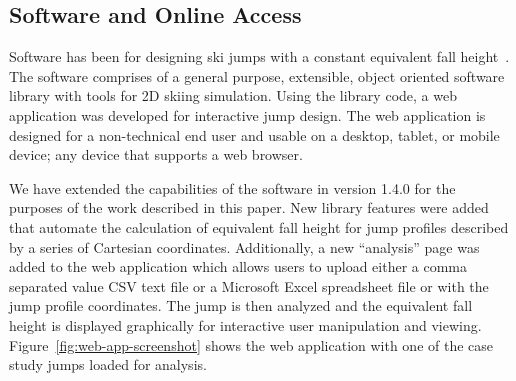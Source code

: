 \documentclass{article}
\begin{document}
\subsection{Software and Online Access}
%
Software has been for designing ski jumps with a constant equivalent fall
height~\cite{Moore2018}. The software comprises of a general purpose,
extensible, object oriented software library with tools for 2D skiing
simulation. Using the library code, a web application was developed for
interactive jump design. The web application is designed for a non-technical
end user and usable on a desktop, tablet, or mobile device; any device that
supports a web browser.

We have extended the capabilities of the software in version 1.4.0 for the
purposes of the work described in this paper. New library features were added
that automate the calculation of equivalent fall height for jump profiles
described by a series of Cartesian coordinates.  Additionally, a new
``analysis'' page was added to the web application which allows users to upload
either a comma separated value CSV text file or a Microsoft Excel spreadsheet
file or with the jump profile coordinates. The jump is then analyzed and the
equivalent fall height is displayed graphically for interactive user
manipulation and viewing. Figure~\ref{fig:web-app-screenshot} shows the web
application with one of the case study jumps loaded for analysis.
%
\end{document}
